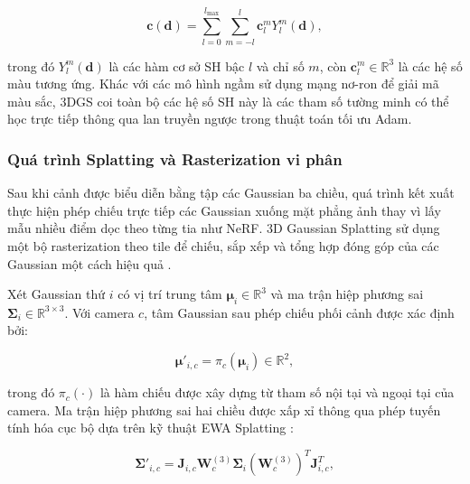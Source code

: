 \begin{equation}
    \mathbf{c}(\mathbf{d})
    =
    \sum_{l=0}^{l_{\max}}
    \sum_{m=-l}^{l}
    \mathbf{c}_l^m Y_l^m(\mathbf{d}),
    \label{eq:3dgs-sh-color}
\end{equation}

trong đó $Y_l^m(\mathbf{d})$ là các hàm cơ sở SH bậc $l$ và chỉ số $m$, còn $\mathbf{c}_l^m \in \mathbb{R}^3$ là các hệ số màu tương ứng. Khác với các mô hình ngầm sử dụng mạng nơ-ron để giải mã màu sắc, 3DGS coi toàn bộ các hệ số SH này là các tham số tường minh có thể học trực tiếp thông qua lan truyền ngược trong thuật toán tối ưu Adam.

\subsubsection{Quá trình Splatting và Rasterization vi phân}
\label{subsubsec:differentiable-splatting-rasterization}

Sau khi cảnh được biểu diễn bằng tập các Gaussian ba chiều, quá trình kết xuất thực hiện phép chiếu trực tiếp các Gaussian xuống mặt phẳng ảnh thay vì lấy mẫu nhiều điểm dọc theo từng tia như NeRF. 3D Gaussian Splatting sử dụng một bộ rasterization theo tile để chiếu, sắp xếp và tổng hợp đóng góp của các Gaussian một cách hiệu quả \cite{kerbl2023gaussian}.

Xét Gaussian thứ $i$ có vị trí trung tâm $\boldsymbol{\mu}_i\in\mathbb{R}^{3}$ và ma trận hiệp phương sai $\boldsymbol{\Sigma}_i\in\mathbb{R}^{3\times3}$. Với camera $c$, tâm Gaussian sau phép chiếu phối cảnh được xác định bởi:

\begin{equation}
    \boldsymbol{\mu}'_{i,c}
    =
    \pi_c
    \left(
        \boldsymbol{\mu}_i
    \right)
    \in\mathbb{R}^{2},
    \label{eq:3dgs-projected-mean}
\end{equation}

trong đó $\pi_c(\cdot)$ là hàm chiếu được xây dựng từ tham số nội tại và ngoại tại của camera. Ma trận hiệp phương sai hai chiều được xấp xỉ thông qua phép tuyến tính hóa cục bộ dựa trên kỹ thuật EWA Splatting \cite{zwicker2001ewa}:

\begin{equation}
    \boldsymbol{\Sigma}'_{i,c}
    =
    \mathbf{J}_{i,c}
    \mathbf{W}^{(3)}_c
    \boldsymbol{\Sigma}_i
    \left(
        \mathbf{W}^{(3)}_c
    \right)^{T}
    \mathbf{J}_{i,c}^{T},
    \label{eq:3dgs-projected-covariance}
\end{equation}

